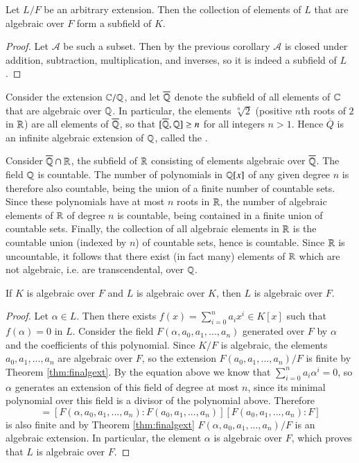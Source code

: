 \documentclass[12pt, a4paper, oneside, openright, titlepage]{book}
\begin{document}
\begin{cor}
    Let $L/F$ be an arbitrary extension. Then the collection of elements of $L$ that are algebraic over $F$ form a subfield of $K$.
\end{cor}
\begin{proof}
    Let $\mathcal{A}$ be such a subset. Then by the previous corollary $\mathcal{A}$ is closed under addition, subtraction, multiplication, and inverses, so it is indeed a subfield of $L$.
\end{proof}


\begin{eg}
    Consider the extension $\mathbb C/\mathbb Q$, and let $\overline{\mathbb Q}$ denote the subfield of all elements of $\mathbb C$ that are algebraic over $\mathbb Q$. In particular, the elements $\sqrt[n]{2}$ (positive $n$th roots of $2$ in $\mathbb R$) are all elements of $\overline{\mathbb Q}$, so that $[\overline{\mathbb Q},\mathbb Q]\geq n$ for all integers $n > 1$. Hence $\overline{Q}$ is an infinite algebraic extension of $\mathbb Q$, called the .

    Consider $\overline{\mathbb Q}\cap \mathbb R$, the subfield of $\mathbb R$ consisting of elements algebraic over $\overline{\mathbb Q}$. The field $\mathbb Q$ is countable. The number of polynomials in $\mathbb Q[x]$ of any given degree $n$ is therefore also countable, being the union of a finite number of countable sets. Since these polynomials have at most $n$ roots in $\mathbb R$, the number of algebraic elements of $\mathbb R$ of degree $n$ is countable, being contained in a finite union of countable sets. Finally, the collection of all algebraic elements in $\mathbb R$ is the countable union (indexed by $n$) of countable sets, hence is countable. Since $\mathbb R$ is uncountable, it follows that there exist (in fact many) elements of $\mathbb R$ which are not algebraic, i.e. are transcendental, over $\mathbb Q$.
\end{eg}


\begin{thm}
    If $K$ is algebraic over $F$ and $L$ is algebraic over $K$, then $L$ is algebraic over $F$.
\end{thm}
\begin{proof}
    Let $\alpha \in L$. Then there exists $f(x) = \sum_{i=0}^n a_ix^i \in K[x]$ such that $f(\alpha) = 0$ in $L$. Consider the field $F(\alpha,a_0,a_1,...,a_n)$ generated over $F$ by $\alpha$ and the coefficients of this polynomial. Since $K/F$ is algebraic, the elements $a_0,a_1,...,a_n$ are algebraic over $F$, so the extension $F(a_0,a_1,...,a_n)/F$ is finite by Theorem \ref{thm:finalgext}. By the equation above we know that $\sum_{i=0}^na_i\alpha^i = 0$, so $\alpha$ generates an extension of this field of degree at most $n$, since its minimal polynomial over this field is a divisor of the polynomial above. Therefore \begin{equation*}
        [F(\alpha,a_0,a_1,...,a_n):F] = [F(\alpha,a_0,a_1,...,a_n):F(a_0,a_1,...,a_n)][F(a_0,a_1,...,a_n):F]
    \end{equation*}
    is also finite and by Theorem \ref{thm:finalgext} $F(\alpha,a_0,a_1,...,a_n)/F$ is an algebraic extension. In particular, the element $\alpha$ is algebraic over $F$, which proves that $L$ is algebraic over $F$.
\end{proof}
\end{document}
